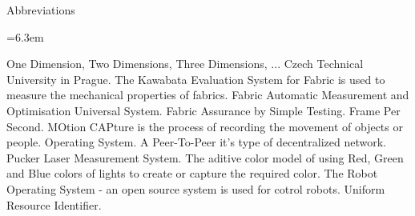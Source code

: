 \app Abbreviations

\medskip
\bgroup \leftskip=6.3em

\abbrv[1D,2D,3D,...] One Dimension, Two Dimensions, Three Dimensions, ...
\abbrv[CTU]  Czech Technical University in Prague.
\abbrv[KESF]  The Kawabata Evaluation System for Fabric is used to measure the mechanical properties of fabrics.
\abbrv[FAMOUS]  Fabric Automatic Measurement and Optimisation Universal System.
\abbrv[FAST]  Fabric Assurance by Simple Testing.
\abbrv[fps]  Frame Per Second.
\abbrv[MOCAP] MOtion CAPture is the process of recording the movement of objects or people.
\abbrv[OS]	Operating System.
\abbrv[P2P]  A Peer-To-Peer it's type of decentralized network. 
\abbrv[PLMS]  Pucker Laser Measurement System.
\abbrv[RGB]  The aditive color model of using Red, Green and Blue colors of lights to create or capture the required color.
\abbrv[ROS]  The Robot Operating System - an open source system is used for cotrol robots.  
\abbrv[URI]  Uniform Resource Identifier.

\par\egroup
